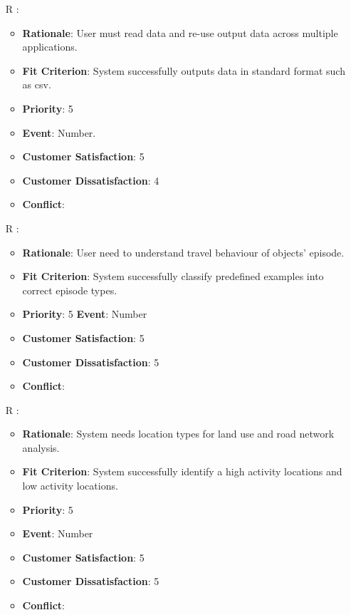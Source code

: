 \documentclass[12pt, titlepage]{article}
\newcounter{reqnum} %
\begin{document}
\begin{itemize}
\item[R\refstepcounter{reqnum}\thereqnum
\label{R_Output_3}:] 
\begin{itemize}
    \item \textbf{Rationale}: User must read data and re-use output data across multiple applications.
    \item \textbf{Fit Criterion}: System successfully outputs data in standard format such as csv. 
    \item \textbf{Priority}: 5
    \item \textbf{Event}: Number.
    \item \textbf{Customer Satisfaction}: 5
    \item \textbf{Customer Dissatisfaction}: 4
    \item \textbf{Conflict}:
\end{itemize}

\item[R\refstepcounter{reqnum}\thereqnum
\label{R_Inputs_1}:] 
\begin{itemize}
    \item \textbf{Rationale}: User need to understand travel behaviour of objects' episode.  
    \item \textbf{Fit Criterion}: System successfully classify predefined examples into correct episode types. 
    \item \textbf{Priority}: 5
    \textbf{Event}: Number
    \item \textbf{Customer Satisfaction}: 5
    \item \textbf{Customer Dissatisfaction}: 5
    \item \textbf{Conflict}:
\end{itemize}

\item[R\refstepcounter{reqnum}\thereqnum
\label{R_Inputs_1}:] 
\begin{itemize}
    \item \textbf{Rationale}: System needs location types for land use and road network analysis.
    \item \textbf{Fit Criterion}: System successfully identify a high activity locations and low activity locations. 
    \item \textbf{Priority}: 5
    \item \textbf{Event}: Number
    \item \textbf{Customer Satisfaction}: 5
    \item \textbf{Customer Dissatisfaction}: 5
    \item \textbf{Conflict}:
\end{itemize}


\end{itemize}
\end{document}
